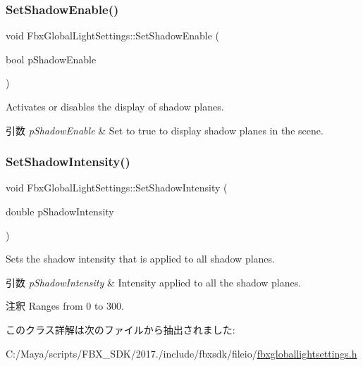 \subsubsection{\texorpdfstring{Set\+Shadow\+Enable()}{SetShadowEnable()}}
{\footnotesize\ttfamily void Fbx\+Global\+Light\+Settings\+::\+Set\+Shadow\+Enable (\begin{DoxyParamCaption}\item[{bool}]{p\+Shadow\+Enable }\end{DoxyParamCaption})}

Activates or disables the display of shadow planes. 
\begin{DoxyParams}{引数}
{\em p\+Shadow\+Enable} & Set to {\ttfamily true} to display shadow planes in the scene. \\
\hline
\end{DoxyParams}
\mbox{\label{class_fbx_global_light_settings_a6835a1d9ee52474a1c5c52dc855a1ba9}} 
\subsubsection{\texorpdfstring{Set\+Shadow\+Intensity()}{SetShadowIntensity()}}
{\footnotesize\ttfamily void Fbx\+Global\+Light\+Settings\+::\+Set\+Shadow\+Intensity (\begin{DoxyParamCaption}\item[{double}]{p\+Shadow\+Intensity }\end{DoxyParamCaption})}

Sets the shadow intensity that is applied to all shadow planes. 
\begin{DoxyParams}{引数}
{\em p\+Shadow\+Intensity} & Intensity applied to all the shadow planes. \\
\hline
\end{DoxyParams}
\begin{DoxyRemark}{注釈}
Ranges from 0 to 300. 
\end{DoxyRemark}


このクラス詳解は次のファイルから抽出されました\+:\begin{DoxyCompactItemize}
\item 
C\+:/\+Maya/scripts/\+F\+B\+X\+\_\+\+S\+D\+K/2017./include/fbxsdk/fileio/\hyperlink{fbxgloballightsettings_8h}{fbxgloballightsettings.\+h}\end{DoxyCompactItemize}
